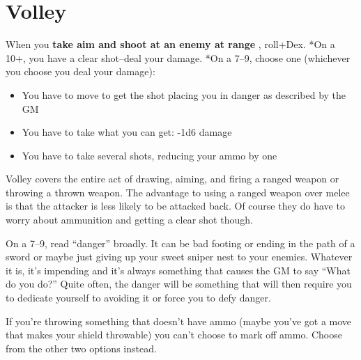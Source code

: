 \section*{Volley}
\HRule
When you \textbf{take aim and shoot at an enemy at range}
, roll+Dex. *On a 10+, you have a clear shot--deal your damage. *On a 7--9, choose one (whichever you choose you deal your damage):
\begin{itemize}
\item You have to move to get the shot placing you in danger as described by the GM
\item You have to take what you can get: -1d6 damage
\item You have to take several shots, reducing your ammo by one
\end{itemize}
\HRule

Volley covers the entire act of drawing, aiming, and firing a ranged weapon or throwing a thrown weapon. The advantage to using a ranged weapon over melee is that the attacker is less likely to be attacked back. Of course they do have to worry about ammunition and getting a clear shot though.

On a 7--9, read ``danger'' broadly. It can be bad footing or ending in the path of a sword or maybe just giving up your sweet sniper nest to your enemies. Whatever it is, it's impending and it's always something that causes the GM to say ``What do you do?'' Quite often, the danger will be something that will then require you to dedicate yourself to avoiding it or force you to defy danger.

If you're throwing something that doesn't have ammo (maybe you've got a move that makes your shield throwable) you can't choose to mark off ammo. Choose from the other two options instead.

